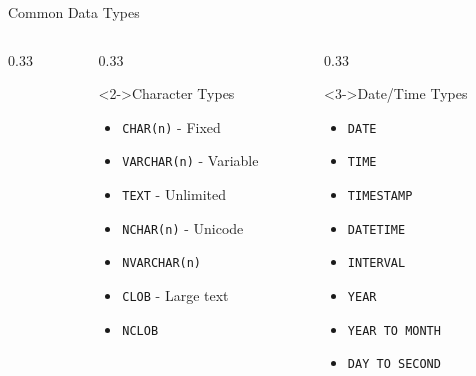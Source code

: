 \documentclass[aspectratio=169,11pt]{beamer}
\begin{document}
\begin{frame}{Common Data Types}
\begin{columns}[T]
\begin{column}{0.33\textwidth}
\end{column}

\pause
\begin{column}{0.33\textwidth}
\begin{block}<2->{Character Types}
\begin{itemize}
    \item \texttt{CHAR(n)} - Fixed
    \item \texttt{VARCHAR(n)} - Variable
    \item \texttt{TEXT} - Unlimited
    \item \texttt{NCHAR(n)} - Unicode
    \item \texttt{NVARCHAR(n)}
    \item \texttt{CLOB} - Large text
    \item \texttt{NCLOB}
\end{itemize}
\end{block}
\end{column}

\pause
\begin{column}{0.33\textwidth}
\begin{block}<3->{Date/Time Types}
\begin{itemize}
    \item \texttt{DATE}
    \item \texttt{TIME}
    \item \texttt{TIMESTAMP}
    \item \texttt{DATETIME}
    \item \texttt{INTERVAL}
    \item \texttt{YEAR}
    \item \texttt{YEAR TO MONTH}
    \item \texttt{DAY TO SECOND}
\end{itemize}
\end{block}
\end{column}
\end{columns}


\end{frame}
\end{document}
